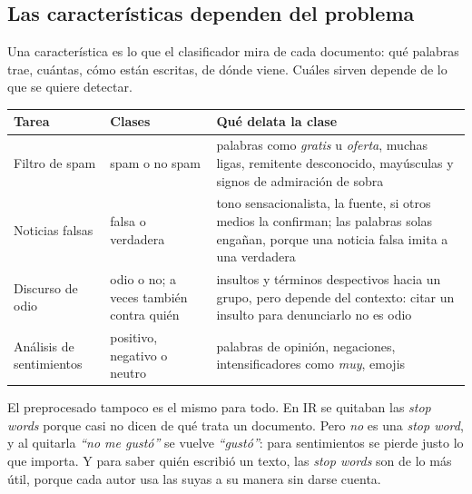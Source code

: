 \documentclass[11pt,letterpaper]{article}
\begin{document}

\subsection*{Las características dependen del problema}

Una característica es lo que el clasificador mira de cada documento:
qué palabras trae, cuántas, cómo están escritas, de dónde viene. Cuáles
sirven depende de lo que se quiere detectar.

\begin{center}
\small
\begin{tabular}{>{\raggedright\arraybackslash}p{2.6cm}%
                >{\raggedright\arraybackslash}p{3.2cm}%
                >{\raggedright\arraybackslash}p{7.6cm}}
    \toprule
    \textbf{Tarea} & \textbf{Clases} & \textbf{Qué delata la clase} \\
    \midrule
    Filtro de spam & spam o no spam
        & palabras como \textit{gratis} u \textit{oferta}, muchas
          ligas, remitente desconocido, mayúsculas y signos de
          admiración de sobra \\
    \addlinespace
    Noticias falsas & falsa o verdadera
        & tono sensacionalista, la fuente, si otros medios la
          confirman; las palabras solas engañan, porque una noticia
          falsa imita a una verdadera \\
    \addlinespace
    Discurso de odio & odio o no; a veces también contra quién
        & insultos y términos despectivos hacia un grupo, pero
          depende del contexto: citar un insulto para denunciarlo no
          es odio \\
    \addlinespace
    Análisis de sentimientos & positivo, negativo o neutro
        & palabras de opinión, negaciones, intensificadores como
          \textit{muy}, emojis \\
    \bottomrule
\end{tabular}
\end{center}

\begin{ojo}
    El preprocesado tampoco es el mismo para todo. En IR se quitaban
    las \textit{stop words} porque casi no dicen de qué trata un
    documento. Pero \textit{no} es una \textit{stop word}, y al
    quitarla \textit{``no me gustó''} se vuelve \textit{``gustó''}:
    para sentimientos se pierde justo lo que importa. Y para saber
    quién escribió un texto, las \textit{stop words} son de lo más
    útil, porque cada autor usa las suyas a su manera sin darse
    cuenta.
\end{ojo}
\end{document}
